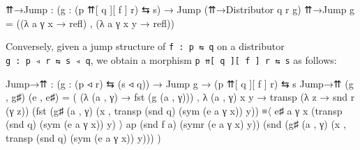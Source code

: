\documentclass[
  11pt,
  oneside,
  article]{memoir}
\newenvironment{Shaded}{}{}
\newcommand{\NormalTok}[1]{#1}
\newcommand{\OtherTok}[1]{\textcolor[rgb]{0.00,0.44,0.13}{#1}}
\theoremstyle{definition}
\theoremstyle{plain}
\newcommand{\0}{\textsf{0}}
\newcommand{\1}{\tn{\textsf{1}}}
\begin{document}
\begin{Shaded}
\begin{Highlighting}[]
\NormalTok{    ⇈→Jump }\OtherTok{:} \OtherTok{(}\NormalTok{g }\OtherTok{:} \OtherTok{(}\NormalTok{p ⇈[ q ][ f ] r}\OtherTok{)}\NormalTok{ ⇆ s}\OtherTok{)} \OtherTok{→}\NormalTok{ Jump }\OtherTok{(}\NormalTok{⇈→Distributor q r g}\OtherTok{)}
\NormalTok{    ⇈→Jump g }\OtherTok{=} \OtherTok{((λ}\NormalTok{ a γ x }\OtherTok{→}\NormalTok{ refl}\OtherTok{)}\NormalTok{ , }\OtherTok{(λ}\NormalTok{ a γ x y }\OtherTok{→}\NormalTok{ refl}\OtherTok{))}
\end{Highlighting}
\end{Shaded}

Conversely, given a jump structure of \texttt{f\ :\ p\ ⇆\ q} on a
distributor \texttt{g\ :\ p\ ◃\ r\ ⇆\ s\ ◃\ q}, we obtain a morphism
\texttt{p\ ⇈{[}\ q\ {]}{[}\ f\ {]}\ r\ ⇆\ s} as follows:

\begin{Shaded}
\begin{Highlighting}[]
\NormalTok{    Jump→⇈ }\OtherTok{:} \OtherTok{(}\NormalTok{g }\OtherTok{:} \OtherTok{(}\NormalTok{p ◃ r}\OtherTok{)}\NormalTok{ ⇆ }\OtherTok{(}\NormalTok{s ◃ q}\OtherTok{))} \OtherTok{→}\NormalTok{ Jump g}
             \OtherTok{→} \OtherTok{(}\NormalTok{p ⇈[ q ][ f ] r}\OtherTok{)}\NormalTok{ ⇆ s}
\NormalTok{    Jump→⇈ }\OtherTok{(}\NormalTok{g , g♯}\OtherTok{)} \OtherTok{(}\NormalTok{e , e♯}\OtherTok{)} \OtherTok{=}
      \OtherTok{(} \OtherTok{(λ} \OtherTok{(}\NormalTok{a , γ}\OtherTok{)} \OtherTok{→}\NormalTok{ fst }\OtherTok{(}\NormalTok{g }\OtherTok{(}\NormalTok{a , γ}\OtherTok{)))} 
\NormalTok{      , }\OtherTok{λ} \OtherTok{(}\NormalTok{a , γ}\OtherTok{)}\NormalTok{ x y }
        \OtherTok{→}\NormalTok{ transp }\OtherTok{(λ}\NormalTok{ z }\OtherTok{→}\NormalTok{ snd r }\OtherTok{(}\NormalTok{γ z}\OtherTok{))}
            \OtherTok{(}\NormalTok{fst }\OtherTok{(}\NormalTok{g♯ }\OtherTok{(}\NormalTok{a , γ}\OtherTok{)} \OtherTok{(}\NormalTok{x , transp }\OtherTok{(}\NormalTok{snd q}\OtherTok{)} \OtherTok{(}\NormalTok{sym }\OtherTok{(}\NormalTok{e a γ x}\OtherTok{))}\NormalTok{ y}\OtherTok{))} 
\NormalTok{                  ≡〈 e♯ a γ x }\OtherTok{(}\NormalTok{transp }\OtherTok{(}\NormalTok{snd q}\OtherTok{)} \OtherTok{(}\NormalTok{sym }\OtherTok{(}\NormalTok{e a γ x}\OtherTok{))}\NormalTok{ y}\OtherTok{)}\NormalTok{ 〉 }
\NormalTok{                  ap }\OtherTok{(}\NormalTok{snd f a}\OtherTok{)} \OtherTok{(}\NormalTok{symr }\OtherTok{(}\NormalTok{e a γ x}\OtherTok{)}\NormalTok{ y}\OtherTok{))}
            \OtherTok{(}\NormalTok{snd }\OtherTok{(}\NormalTok{g♯ }\OtherTok{(}\NormalTok{a , γ}\OtherTok{)} \OtherTok{(}\NormalTok{x , transp }\OtherTok{(}\NormalTok{snd q}\OtherTok{)} \OtherTok{(}\NormalTok{sym }\OtherTok{(}\NormalTok{e a γ x}\OtherTok{))}\NormalTok{ y}\OtherTok{)))} \OtherTok{)}
\end{Highlighting}
\end{Shaded}
\end{document}
